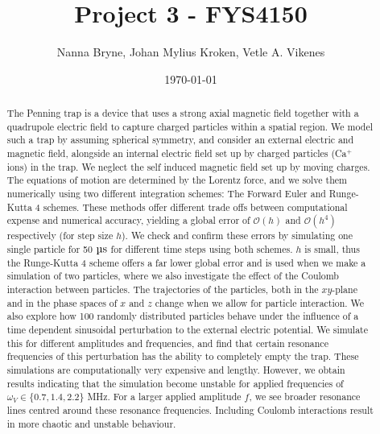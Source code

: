 



\title{Project 3 - FYS4150} 
\author{Nanna Bryne, Johan Mylius Kroken, Vetle A. Vikenes} 
\date{\today}                             
\noaffiliation                            

\begin{abstract}
    The Penning trap is a device that uses a strong axial magnetic field together with a quadrupole electric field to capture charged particles within a spatial region. We model such a trap by assuming spherical symmetry, and consider an external electric and magnetic field, alongside an internal electric field set up by charged particles (Ca$^+$ ions) in the trap. We neglect the self induced magnetic field set up by moving charges. The equations of motion are determined by the Lorentz force, and we solve them numerically using two different integration schemes: The Forward Euler and Runge-Kutta 4 schemes. These methods offer different trade offs between computational expense and numerical accuracy, yielding a global error of $\mathcal{O}(h)$ and $\mathcal{O}(h^4)$ respectively (for step size $h$). We check and confirm these errors by simulating one single particle for 50 $\mus$ for different time steps using both schemes. $h$ is small, thus the Runge-Kutta 4 scheme offers a far lower global error and is used when we make a simulation of two particles, where we also investigate the effect of the Coulomb interaction between particles. The trajectories of the particles, both in the $xy$-plane and in the phase spaces of $x$ and $z$ change when we allow for particle interaction. We also explore how 100 randomly distributed particles behave under the influence of a time dependent sinusoidal perturbation to the external electric potential. We simulate this for different amplitudes and frequencies, and find that certain resonance frequencies of this perturbation has the ability to completely empty the trap. These simulations are computationally very expensive and lengthy. However, we obtain results indicating that the simulation become unstable for applied frequencies of $\omega_V\in\{0.7,1.4, 2.2\}$ MHz. For a larger applied amplitude $f$, we see broader resonance lines centred around these resonance frequencies. Including Coulomb interactions result in more chaotic and unstable behaviour.
\end{abstract}
\maketitle














 



